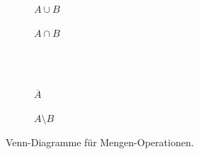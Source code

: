 \documentclass[11pt, a4paper]{article}
\theoremstyle{definition}
\theoremstyle{plain}
\numberwithin{equation}{section}
\newcommand{\comp}[1]{\overline{#1}}
\begin{document}
\begin{figure}
	\centering
	\begin{subfigure}[b]{.49\textwidth}
		\centering
		
		\caption{$A \cup B$}
		\label{fig:venn_union}
	\end{subfigure}
	\begin{subfigure}[b]{.49\textwidth}
		\centering
		
		\caption{$A \cap B$}
		\label{fig:venn_intersection}
	\end{subfigure}\\
	\ \\
	\begin{subfigure}[b]{.49\textwidth}
		\centering
		
		\caption{$\comp{A}$}
		\label{fig:venn_complement}
	\end{subfigure}
	\begin{subfigure}[b]{.49\textwidth}
		\centering
		
		\caption{$A \setminus B$}
		\label{fig:venn_setminus}
	\end{subfigure}
	\caption{Venn-Diagramme für Mengen-Operationen.}
	\label{fig:venn}
\end{figure}
\end{document}
